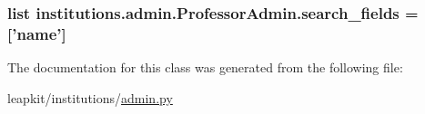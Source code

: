 \hypertarget{classinstitutions_1_1admin_1_1_professor_admin_ab57e3a1e6cc7c5f59cc1ee7a71fff83f}{
\subsubsection[{search\-\_\-fields}]{\setlength{\rightskip}{0pt plus 5cm}list institutions.\-admin.\-Professor\-Admin.\-search\-\_\-fields = \mbox{[}'name'\mbox{]}\hspace{0.3cm}{\ttfamily [static]}}}\label{classinstitutions_1_1admin_1_1_professor_admin_ab57e3a1e6cc7c5f59cc1ee7a71fff83f}


The documentation for this class was generated from the following file\-:\begin{DoxyCompactItemize}
\item 
leapkit/institutions/\hyperlink{institutions_2admin_8py}{admin.\-py}\end{DoxyCompactItemize}
